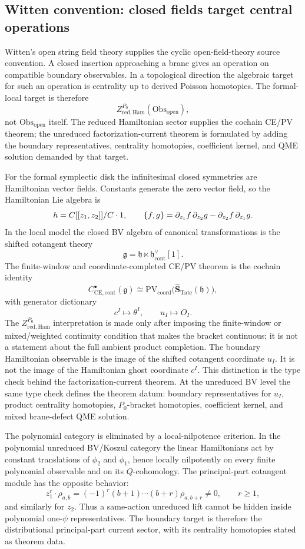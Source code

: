 \subsection{Witten convention: closed fields target central operations}

Witten's open string field theory supplies the cyclic open-field-theory
source convention.  A closed insertion approaching a brane gives an
operation on compatible boundary observables.  In a topological
direction the algebraic target for such an operation is centrality up to
derived Poisson homotopies.  The formal-local target is therefore
\[
  Z^{P_0}_{\mathrm{red,Ham}}(\mathrm{Obs}_{\mathrm{open}}),
\]
not \(\mathrm{Obs}_{\mathrm{open}}\) itself.  The reduced Hamiltonian
sector supplies the cochain CE/PV theorem; the unreduced
factorization-current theorem is formulated by adding the boundary
representatives, centrality homotopies, coefficient kernel, and QME
solution demanded by that target.

For the formal symplectic disk the infinitesimal closed symmetries are
Hamiltonian vector fields. Constants generate the zero vector field,
so the Hamiltonian Lie algebra is
\[
  h=C[[z_1,z_2]]/C\cdot1,
  \qquad
  \{f,g\}
  =\partial_{z_1}f\,\partial_{z_2}g
   -\partial_{z_2}f\,\partial_{z_1}g .
\]
In the local model the closed BV algebra of canonical transformations is
the shifted cotangent theory
\[
  \mathfrak g
  =\mathfrak h\ltimes\mathfrak h^\vee_{\mathrm{cont}}[1].
\]
The finite-window and coordinate-completed CE/PV theorem is the
cochain identity
\[
  C^\bullet_{\mathrm{CE},\mathrm{cont}}(\mathfrak g)
  \cong
  \mathrm{PV}_{\mathrm{coord}}
  \bigl(\widehat{\mathbf S}_{\mathrm{Tate}}(\mathfrak h)\bigr),
\]
with generator dictionary
\[
  c^I\mapsto\theta^I,\qquad u_I\mapsto O_I .
\]
The \(Z^{P_0}_{\mathrm{red,Ham}}\) interpretation is made only after
imposing the finite-window or mixed/weighted continuity condition that
makes the bracket continuous; it is not a statement about the full
ambient product completion.
The boundary Hamiltonian observable is the image of the shifted
cotangent coordinate \(u_I\). It is not the image of the Hamiltonian
ghost coordinate \(c^I\). This distinction is the type check behind
the factorization-current theorem.  At the unreduced BV level the same
type check defines the theorem datum: boundary representatives for
\(u_I\), product centrality homotopies, \(P_0\)-bracket homotopies,
coefficient kernel, and mixed brane-defect QME solution.

The polynomial category is eliminated by a local-nilpotence criterion.
In the polynomial unreduced BV/Koszul category the linear Hamiltonians
act by constant translations of \(\phi_2\) and \(\phi_1\), hence
locally nilpotently on every finite polynomial observable and on its
\(Q\)-cohomology. The principal-part cotangent module has the opposite
behavior:
\[
  z_1^r\cdot\rho_{a,b}
  =(-1)^r(b+1)\cdots(b+r)\rho_{a,b+r}\neq0,
  \qquad r\geq1,
\]
and similarly for \(z_2\). Thus a same-action unreduced lift cannot be
hidden inside polynomial one-\(\psi\) representatives. The boundary
target is therefore the distributional principal-part current sector,
with its centrality homotopies stated as theorem data.

